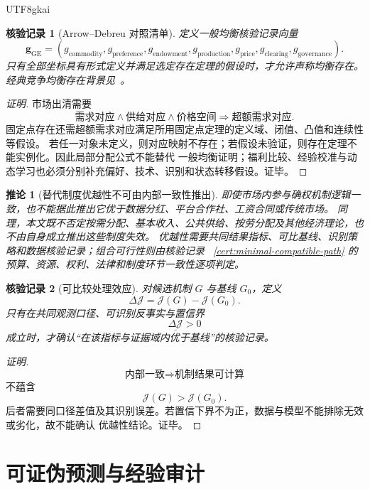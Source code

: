 \documentclass[12pt,a4paper,openany]{report}
\newtheorem{corollary}{推论}[chapter]
\newtheorem{Certificate}{核验记录}[chapter]
\begin{document}
\begin{CJK*}{UTF8}{gkai}
\begin{Certificate}[Arrow--Debreu 对照清单]
定义一般均衡核验记录向量
\[
  \mathbf g_{\mathrm{GE}}
  =
  (g_{\mathrm{commodity}},g_{\mathrm{preference}},g_{\mathrm{endowment}},
  g_{\mathrm{production}},g_{\mathrm{price}},g_{\mathrm{clearing}},
  g_{\mathrm{governance}}).
\]
只有全部坐标具有形式定义并满足选定存在定理的假设时，才允许声称均衡存在。
经典竞争均衡存在背景见~\cite{ArrowDebreu1954Equilibrium}。
\end{Certificate}

\begin{proof}[证明]
市场出清需要
\[
  \text{需求对应}\wedge\text{供给对应}\wedge\text{价格空间}
  \Longrightarrow
  \text{超额需求对应}.
\]
固定点存在还需超额需求对应满足所用固定点定理的定义域、闭值、凸值和连续性等假设。
若任一对象未定义，则对应映射不存在；若假设未验证，则存在定理不能实例化。因此局部分配公式不能替代
一般均衡证明；福利比较、经验校准与动态学习也必须分别补充偏好、技术、识别和状态转移假设。证毕。
\end{proof}

\begin{corollary}[替代制度优越性不可由内部一致性推出]
\label{cor:no-superiority-without-comparison}
即使市场内参与确权机制逻辑一致，也不能据此推出它优于数据分红、平台合作社、工资合同或传统市场。
同理，本文既不否定按需分配、基本收入、公共供给、按劳分配及其他经济理论，也不由自身成立推出这些制度失效。
优越性需要共同结果指标、可比基线、识别策略和数据核验记录；组合可行性则由核验记录
~\ref{cert:minimal-compatible-path} 的预算、资源、权利、法律和制度环节一致性逐项判定。
\end{corollary}

\begin{Certificate}[可比较处理效应]
对候选机制 \(G\) 与基线 \(G_0\)，定义
\[
  \Delta\mathcal J
  =
  \mathcal J(G)-\mathcal J(G_0).
\]
只有在共同观测口径、可识别反事实与置信界
\[
  \underline{\Delta\mathcal J}>0
\]
成立时，才确认“在该指标与证据域内优于基线”的核验记录。
\end{Certificate}

\begin{proof}[证明]
\[
  \text{内部一致}
  \Longrightarrow
  \text{机制结果可计算}
\]
不蕴含
\[
  \mathcal J(G)>\mathcal J(G_0).
\]
后者需要同口径差值及其识别误差。若置信下界不为正，数据与模型不能排除无效或劣化，故不能确认
优越性结论。证毕。
\end{proof}

\section{可证伪预测与经验审计}


\end{CJK*}
\end{document}
